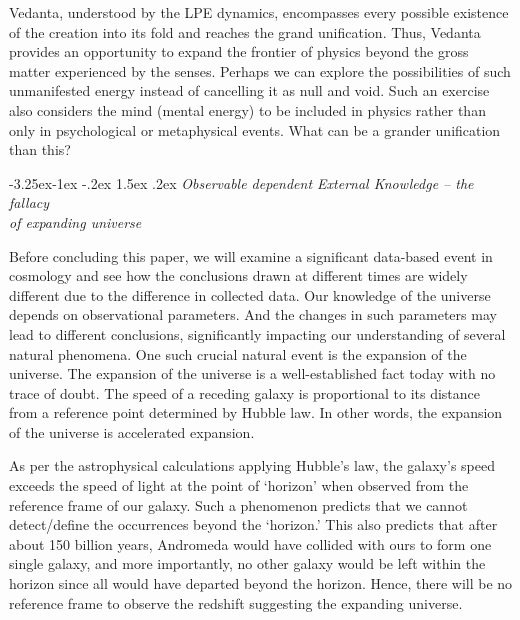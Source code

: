 \documentclass[twoside, 13pt]{article}
\makeatletter
\renewcommand\subsection{\@startsection{subsection}{2}{\z@}%
                                     {-3.25ex\@plus -1ex \@minus -.2ex}%
                                     {1.5ex \@plus .2ex}%
                                     {\normalfont\Large\bfseries}}
\makeatother
\begin{document}
{{{Vedanta, understood by the LPE dynamics, encompasses every possible existence of the creation into its fold and reaches the grand unification. Thus, Vedanta provides an opportunity to expand the frontier of physics beyond the gross matter experienced by the senses. Perhaps we can explore the possibilities of such unmanifested energy instead of cancelling it as null and void. Such an exercise also considers the mind (mental energy) to be included in physics rather than only in psychological or metaphysical events. What can be a grander unification than this?}


{\fontsize{8}{10}\selectfont\subsection{\textit{Observable dependent External Knowledge – the fallacy\\ of expanding universe}}}\label{subsec-4.3}

{\fontsize{12}{14}\selectfont Before concluding this paper, we will examine a significant data-based event in cosmology and see how the conclusions drawn at different times are widely different due to the difference in collected data. Our knowledge of the universe depends on observational parameters. And the changes in such parameters may lead to different conclusions, significantly impacting our understanding of several natural phenomena. One such crucial natural event is the expansion of the universe. The expansion of the universe is a well-established fact today with no trace of doubt. The speed of a receding galaxy is proportional to its distance from a reference point determined by Hubble law. In other words, the expansion of the universe is accelerated expansion.

As per the astrophysical calculations applying Hubble’s law, the galaxy's speed exceeds the speed of light at the point of ‘horizon’ when observed from the reference frame of our galaxy. Such a phenomenon predicts that we cannot detect/define the occurrences beyond the ‘horizon.’ This also predicts that after about 150 billion years, Andromeda would have collided with ours to form one single galaxy, and more importantly, no other galaxy would be left within the horizon since all would have departed beyond the horizon. Hence, there will be no reference frame to observe the redshift suggesting the expanding universe. 

}}}
\end{document}
